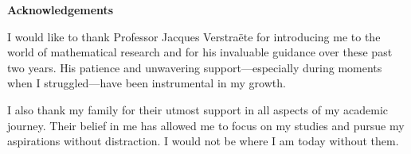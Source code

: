 \begin{center}
  \textbf{\Large Acknowledgements}
\end{center}

\vspace{0.5cm}

I would like to thank Professor Jacques Verstraëte for introducing me to the world of mathematical research and for his invaluable guidance over these past two years. His patience and unwavering support—especially during moments when I struggled—have been instrumental in my growth.

I also thank my family for their utmost support in all aspects of my academic journey. Their belief in me has allowed me to focus on my studies and pursue my aspirations without distraction. I would not be where I am today without them.